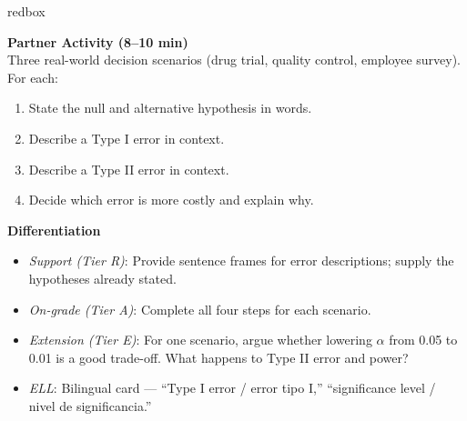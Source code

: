 \documentclass[10pt]{article}
\begin{document}
\begin{skillbox}{redbox}
\begin{minipage}[t]{0.48\linewidth}
    \textbf{Partner Activity (8--10 min)}\\
    Three real-world decision scenarios (drug trial, quality control, employee survey).
    For each:
    \begin{enumerate}
        \item State the null and alternative hypothesis in words.
        \item Describe a Type I error in context.
        \item Describe a Type II error in context.
        \item Decide which error is more costly and explain why.
    \end{enumerate}
\end{minipage}
\hfill
\begin{minipage}[t]{0.48\linewidth}
    \textbf{Differentiation}
    \begin{itemize}
        \item \textit{Support (Tier R)}: Provide sentence frames for error descriptions;
              supply the hypotheses already stated.
        \item \textit{On-grade (Tier A)}: Complete all four steps for each scenario.
        \item \textit{Extension (Tier E)}: For one scenario, argue whether lowering
              $\alpha$ from 0.05 to 0.01 is a good trade-off. What happens to Type II
              error and power?
        \item \textit{ELL}: Bilingual card --- ``Type I error / error tipo I,''
              ``significance level / nivel de significancia.''
    \end{itemize}
\end{minipage}
\end{skillbox}
\end{document}
